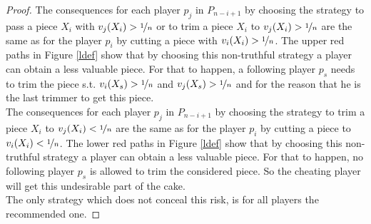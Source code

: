 \begin{proof}
The consequences for each player $p_j$ in $P_{n-i+1}$ by choosing the strategy to pass a piece $X_i$ with $v_j(X_i)>\nicefrac{1}{n}$ or to trim a piece $X_i$ to $v_j(X_i)>\nicefrac{1}{n}$ are the same as for the player $p_i$ by cutting a piece with $v_i(X_i)>\nicefrac{1}{n}$.
The upper red paths in Figure \ref{ldef} show that by choosing this non-truthful strategy a player can obtain a less valuable piece. For that to happen, a following player $p_s$ needs to trim the piece s.t. $v_i(X_s)>\nicefrac{1}{n}$ and $v_j(X_s)>\nicefrac{1}{n}$ and for the reason that he is the last trimmer to get this piece.\\
\newline
The consequences for each player $p_j$ in $P_{n-i+1}$ by choosing the strategy to trim a piece $X_i$ to $v_j(X_i)<\nicefrac{1}{n}$ are the same as for the player $p_i$ by cutting a piece to $v_i(X_i)<\nicefrac{1}{n}$. The lower red paths in Figure \ref{ldef} show that by choosing this non-truthful strategy a player can obtain a less valuable piece. For that to happen, no following player $p_s$ is allowed to trim the considered piece. So the cheating player will get this undesirable part of the cake.
\\
\newline
The only strategy which does not conceal this risk, is for all players the recommended one.
\end{proof}

